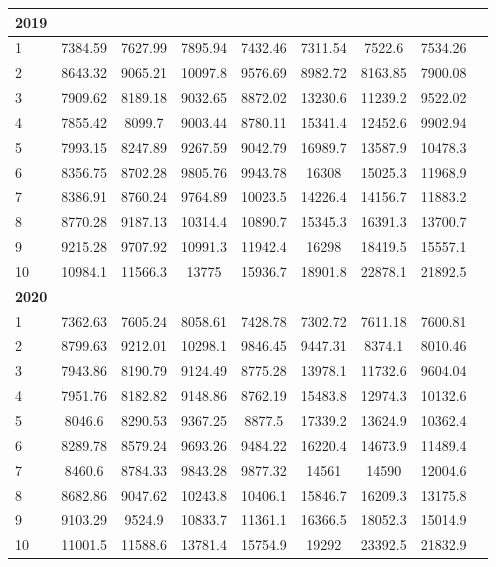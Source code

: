 \documentclass[jmse,article,submit,pdftex,moreauthors]{Definitions/mdpi}
\begin{document}
\begin{longtable}{@{\extracolsep{\fill}}p{1.5cm}cccccccc@{}}
\bf{2019} &  &  &  &  &  &  & \\
\hline
1 & 7384.59 & 7627.99 & 7895.94 & 7432.46 & 7311.54 & 7522.6 & 7534.26 \\
2 & 8643.32 & 9065.21 & 10097.8 & 9576.69 & 8982.72 & 8163.85 & 7900.08 \\
3 & 7909.62 & 8189.18 & 9032.65 & 8872.02 & 13230.6 & 11239.2 & 9522.02 \\
4 & 7855.42 & 8099.7 & 9003.44 & 8780.11 & 15341.4 & 12452.6 & 9902.94 \\
5 & 7993.15 & 8247.89 & 9267.59 & 9042.79 & 16989.7 & 13587.9 & 10478.3 \\
6 & 8356.75 & 8702.28 & 9805.76 & 9943.78 & 16308 & 15025.3 & 11968.9 \\
7 & 8386.91 & 8760.24 & 9764.89 & 10023.5 & 14226.4 & 14156.7 & 11883.2 \\
8 & 8770.28 & 9187.13 & 10314.4 & 10890.7 & 15345.3 & 16391.3 & 13700.7 \\
9 & 9215.28 & 9707.92 & 10991.3 & 11942.4 & 16298 & 18419.5 & 15557.1 \\
10 & 10984.1 & 11566.3 & 13775 & 15936.7 & 18901.8 & 22878.1 & 21892.5 \\
\hline
\bf{2020} &  &  &  & & & & \\
\hline
1 & 7362.63 & 7605.24 & 8058.61 & 7428.78 & 7302.72 & 7611.18 & 7600.81 \\
2 & 8799.63 & 9212.01 & 10298.1 & 9846.45 & 9447.31 & 8374.1 & 8010.46 \\
3 & 7943.86 & 8190.79 & 9124.49 & 8775.28 & 13978.1 & 11732.6 & 9604.04 \\
4 & 7951.76 & 8182.82 & 9148.86 & 8762.19 & 15483.8 & 12974.3 & 10132.6 \\
5 & 8046.6 & 8290.53 & 9367.25 & 8877.5 & 17339.2 & 13624.9 & 10362.4 \\
6 & 8289.78 & 8579.24 & 9693.26 & 9484.22 & 16220.4 & 14673.9 & 11489.4 \\
7 & 8460.6 & 8784.33 & 9843.28 & 9877.32 & 14561 & 14590 & 12004.6 \\
8 & 8682.86 & 9047.62 & 10243.8 & 10406.1 & 15846.7 & 16209.3 & 13175.8 \\
9 & 9103.29 & 9524.9 & 10833.7 & 11361.1 & 16366.5 & 18052.3 & 15014.9 \\
10 & 11001.5 & 11588.6 & 13781.4 & 15754.9 & 19292 & 23392.5 & 21832.9 \\
\hline


\end{longtable}
\end{document}
